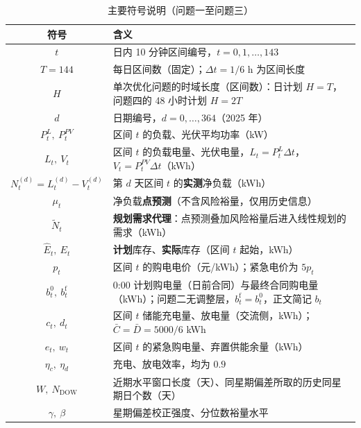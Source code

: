 \begin{table}[htbp]
  \centering
  \caption{主要符号说明（问题一至问题三）}
  \label{tab:sym-common}
  \small
  \begin{tabularx}{0.9\textwidth}{cX}
    \toprule
    符号 & 含义 \\
    \midrule
    $t$ & 日内 10 分钟区间编号，$t=0,1,\dots,143$ \\
    $T=144$ & 每日区间数（固定）；$\Delta t=1/6$ h 为区间长度 \\
    $H$ & 单次优化问题的时域长度（区间数）：日计划 $H=T$，问题四的 48 小时计划 $H=2T$ \\
    $d$ & 日期编号，$d=0,\dots,364$（2025 年） \\
    $P^L_t,\ P^{PV}_t$ & 区间 $t$ 的负载、光伏平均功率（kW） \\
    $L_t,\ V_t$ & 区间 $t$ 的负载电量、光伏电量，$L_t=P^L_t\Delta t$，$V_t=P^{PV}_t\Delta t$（kWh） \\
    $N_t^{(d)}=L_t^{(d)}-V_t^{(d)}$ & 第 $d$ 天区间 $t$ 的\textbf{实测}净负载（kWh） \\
    $\mu_t$ & 净负载\textbf{点预测}（不含风险裕量，仅用历史信息） \\
    $\widetilde N_t$ & \textbf{规划需求代理}：点预测叠加风险裕量后进入线性规划的需求（kWh） \\
    $\widehat E_t,\ E_t$ & \textbf{计划}库存、\textbf{实际}库存（区间 $t$ 起始，kWh） \\
    $p_t$ & 区间 $t$ 的购电电价（元/kWh）；紧急电价为 $5p_t$ \\
    $b^{0}_t,\ b^{\mathrm f}_t$ & 0:00 计划购电量（日前合同）与最终合同购电量（kWh）；问题二无调整层，$b^{\mathrm f}_t=b^{0}_t$，正文简记 $b_t$ \\
    $c_t,\ d_t$ & 区间 $t$ 储能充电量、放电量（交流侧，kWh）；$\bar C=\bar D=5000/6$ kWh \\
    $e_t,\ w_t$ & 区间 $t$ 的紧急购电量、弃置供能余量（kWh） \\
    $\eta_c,\ \eta_d$ & 充电、放电效率，均为 $0.9$ \\
    $W,\ N_{\mathrm{DOW}}$ & 近期水平窗口长度（天）、同星期偏差所取的历史同星期日个数（天） \\
    $\gamma,\ \beta$ & 星期偏差校正强度、分位数裕量水平 \\
    \bottomrule
  \end{tabularx}
\end{table}

